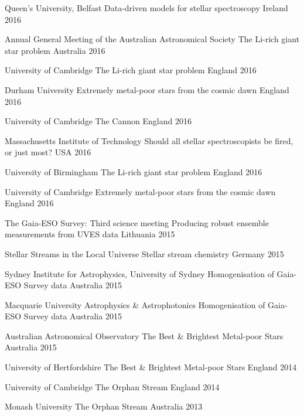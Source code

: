 

\begin{cvhonors}

  \cvhonor
    {Queen's University, Belfast}
    {Data-driven models for stellar spectroscopy}
    {Ireland}
    {2016}
 
   \cvhonor
   	{Annual General Meeting of the Australian Astronomical Society}
	{The Li-rich giant star problem}
	{Australia}
	{2016}

	\cvhonor
	{University of Cambridge}
	{The Li-rich giant star problem}
	{England}
	{2016}
	
   	\cvhonor
   	{Durham University}
	{Extremely metal-poor stars from the cosmic dawn}
	{England}
	{2016}

	\cvhonor
	{University of Cambridge}
	{The Cannon}
	{England}
	{2016}
	
	\cvhonor
	{Massachusetts Institute of Technology}
	{Should all stellar spectroscopists be fired, or just most?}
	{USA}
	{2016}
	
	\cvhonor
	{University of Birmingham}
	{The Li-rich giant star problem}
	{England}
	{2016}
	
	\cvhonor
	{University of Cambridge}
	{Extremely metal-poor stars from the cosmic dawn}
	{England}
	{2016}
	




	\cvhonor
	{The Gaia-ESO Survey: Third science meeting}
	{Producing robust ensemble measurements from UVES data}
	{Lithuania}
	{2015}

	\cvhonor
	{Stellar Streams in the Local Universe}
	{Stellar stream chemistry}
	{Germany}
	{2015}
	
	\cvhonor
	{Sydney Institute for Astrophysics, University of Sydney}
	{Homogenisation of Gaia-ESO Survey data}
	{Australia}
	{2015}
	
	\cvhonor
	{Macquarie University Astrophysics \& Astrophotonics}
	{Homogenisation of Gaia-ESO Survey data}
	{Australia}
	{2015}

	\cvhonor
	{Australian Astronomical Observatory}
	{The Best \& Brightest Metal-poor Stars}
	{Australia}
	{2015}

	\cvhonor
	{University of Hertfordshire}
	{The Best \& Brightest Metal-poor Stars}
	{England}
	{2014}

	\cvhonor
	{University of Cambridge}
	{The Orphan Stream}
	{England}
	{2014}

	\cvhonor
	{Monash University}
	{The Orphan Stream}
	{Australia}
	{2013}


\end{cvhonors}

